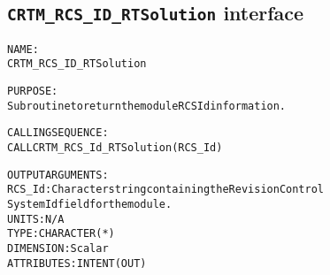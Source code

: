 \subsection{\texttt{CRTM\_RCS\_ID\_RTSolution} interface}
  \label{sec:CRTM_RCS_ID_RTSolution_interface}
  \begin{alltt}
 
  NAME:
        CRTM_RCS_ID_RTSolution
 
  PURPOSE:
        Subroutine to return the module RCS Id information.
 
  CALLING SEQUENCE:
        CALL CRTM_RCS_Id_RTSolution( RCS_Id )
 
  OUTPUT ARGUMENTS:
        RCS_Id:        Character string containing the Revision Control
                       System Id field for the module.
                       UNITS:      N/A
                       TYPE:       CHARACTER(*)
                       DIMENSION:  Scalar
                       ATTRIBUTES: INTENT(OUT)
 
  \end{alltt}
